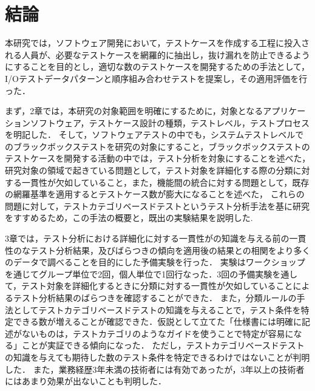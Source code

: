 \chapter{結論}

本研究では，ソフトウェア開発において，テストケースを作成する工程に投入される人員が、必要なテストケースを網羅的に抽出し，抜け漏れを防止できるようにすることを目的とし，適切な数のテストケースを開発するための手法として，I/Oテストデータパターンと順序組み合わせテストを提案し，その適用評価を行った．

まず，2章では，本研究の対象範囲を明確にするために，対象となるアプリケーションソフトウェア，テストケース設計の種類，テストレベル，テストプロセスを明記した．
そして，ソフトウェアテストの中でも，システムテストレベルでのブラックボックステストを研究の対象にすること，ブラックボックステストのテストケースを開発する活動の中では，テスト分析を対象にすることを述べた，
研究対象の領域で起きている問題として，テスト対象を詳細化する際の分類に対する一貫性が欠如していること，また，機能間の統合に対する問題として，既存の網羅基準を適用するとテストケース数が゙膨大になることを述べた，
これらの問題に対して，テストカテゴリベースドテストというテスト分析手法を基に研究をすすめるため，この手法の概要と，既出の実験結果を説明した.

3章では，テスト分析における詳細化に対する一貫性がの知識を与える前の一貫性のなテスト分析結果，及びばらつきの傾向を適用後の結果との相関をより多くのデータで調べることを目的にした予備実験を行った．
実験はワークショップを通じてグループ単位で2回，個人単位で1回行なった．3回の予備実験を通して，テスト対象を詳細化するときに分類に対する一貫性が欠如していることによるテスト分析結果のばらつきを確認することができた．
また，分類ルールの手法としてテストカテゴリベースドテストの知識を与えることで，テスト条件を特定できる数が増えることが確認できた．仮説として立てた「仕様書には明確に記述がないものは，テストカテゴリのようなガイドを使うことで特定が容易になる」ことが実証できる傾向になった．
ただし，テストカテゴリベースドテストの知識を与えても期待した数のテスト条件を特定できるわけではないことが判明した．
また，業務経歴3年未満の技術者には有効であったが，3年以上の技術者にはあまり効果が出ないことも判明した．


